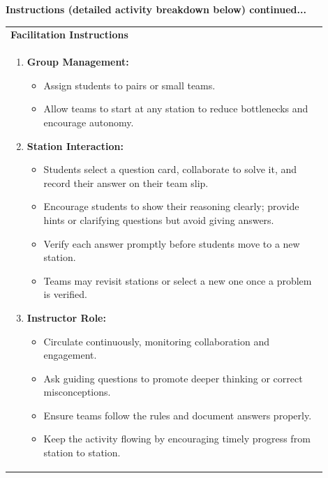 \documentclass{article}
\begin{document}
\noindent
{\large \textbf{Instructions (detailed activity breakdown below) continued...}} \\
\vspace{0.5cm}
\noindent
\begin{tabular}{|p{0.9\linewidth}|}
\hline
{\large\textbf{Facilitation Instructions}} \\
\begin{enumerate}
    \item \textbf{Group Management:} 
    \begin{itemize}
        \item Assign students to pairs or small teams.
        \item Allow teams to start at any station to reduce bottlenecks and encourage autonomy.
    \end{itemize}

    \item \textbf{Station Interaction:} 
    \begin{itemize}
        \item Students select a question card, collaborate to solve it, and record their answer on their team slip.
        \item Encourage students to show their reasoning clearly; provide hints or clarifying questions but avoid giving answers.
        \item Verify each answer promptly before students move to a new station.
        \item Teams may revisit stations or select a new one once a problem is verified.
    \end{itemize}

    \item \textbf{Instructor Role:}
    \begin{itemize}
        \item Circulate continuously, monitoring collaboration and engagement.
        \item Ask guiding questions to promote deeper thinking or correct misconceptions.
        \item Ensure teams follow the rules and document answers properly.
        \item Keep the activity flowing by encouraging timely progress from station to station.
    \end{itemize}
\end{enumerate} \\
\hline
\end{tabular}
\end{document}
